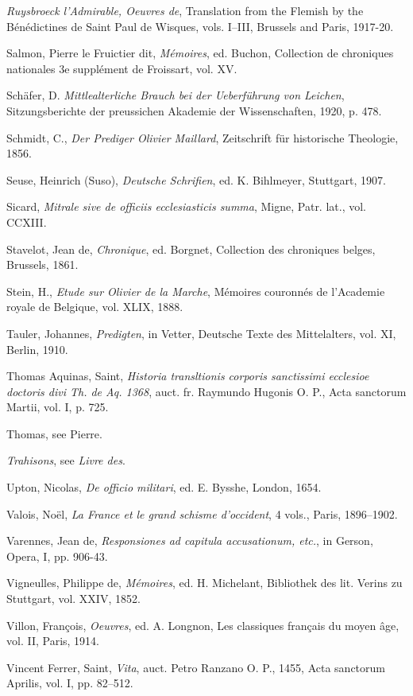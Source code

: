 \emph{Ruysbroeck l'Admirable, Oeuvres de}, Translation from the Flemish
by the Bénédictines de Saint Paul de Wisques, vols. I--III, Brussels and
Paris, 1917-20.

Salmon, Pierre le Fruictier dit, \emph{Mémoires}, ed. Buchon, Collection
de chroniques nationales 3e supplément de Froissart, vol. XV.

Schäfer, D. \emph{Mittlealterliche Brauch bei der Ueberführung von
Leichen}, Sitzungsberichte der preussichen Akademie der Wissenschaften,
1920, p. 478.

Schmidt, C., \emph{Der Prediger Olivier Maillard}, Zeitschrift für
historische Theologie, 1856.

Seuse, Heinrich (Suso), \emph{Deutsche Schrifien}, ed. K. Bihlmeyer,
Stuttgart, 1907.

\protect\hypertarget{24_BIBLIOGRAPHY.xhtmlux5cux23page_449}{}{}Sicard,
\emph{Mitrale sive de officiis ecclesiasticis summa}, Migne, Patr. lat.,
vol. CCXIII.

Stavelot, Jean de, \emph{Chronique}, ed. Borgnet, Collection des
chroniques belges, Brussels, 1861.

Stein, H., \emph{Etude sur Olivier de la Marche}, Mémoires couronnés de
l'Academie royale de Belgique, vol. XLIX, 1888.

Tauler, Johannes, \emph{Predigten}, in Vetter, Deutsche Texte des
Mittelalters, vol. XI, Berlin, 1910.

Thomas Aquinas, Saint, \emph{Historia transltionis corporis sanctissimi
ecclesioe doctoris divi Th. de Aq. 1368}, auct. fr. Raymundo Hugonis O.
P., Acta sanctorum Martii, vol. I, p. 725.

Thomas, see Pierre.

\emph{Trahisons}, see \emph{Livre des}.

Upton, Nicolas, \emph{De officio militari}, ed. E. Bysshe, London, 1654.

Valois, Noël, \emph{La France et le grand schisme d'occident}, 4 vols.,
Paris, 1896--1902.

Varennes, Jean de, \emph{Responsiones ad capitula accusationum, etc.},
in Gerson, Opera, I, pp. 906-43.

Vigneulles, Philippe de, \emph{Mémoires}, ed. H. Michelant, Bibliothek
des lit. Verins zu Stuttgart, vol. XXIV, 1852.

Villon, François, \emph{Oeuvres}, ed. A. Longnon, Les classiques
français du moyen âge, vol. II, Paris, 1914.

Vincent Ferrer, Saint, \emph{Vita}, auct. Petro Ranzano O. P., 1455,
Acta sanctorum Aprilis, vol. I, pp. 82--512.

